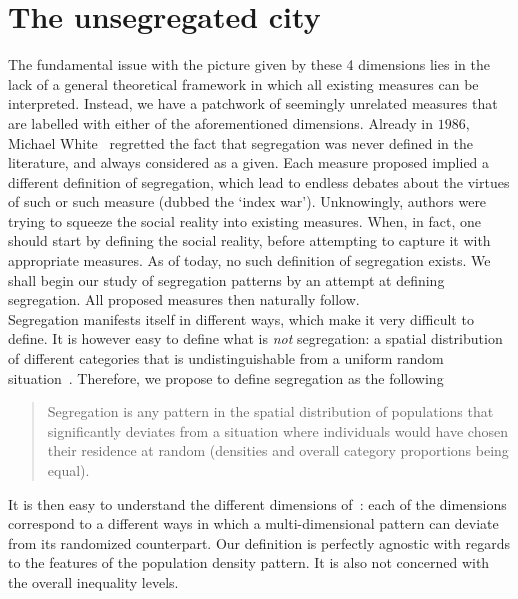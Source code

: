\section{The unsegregated city}
\label{sec:null_model_the_unsegregated_city}

The fundamental issue with the picture given by these 4 dimensions lies in the
lack of a general theoretical framework in which all existing measures can be
interpreted.  Instead, we have a patchwork of seemingly unrelated measures that
are labelled with either of the aforementioned dimensions. Already in $1986$,
Michael White~\cite{White:1986} regretted the fact that segregation was never
defined in the literature, and always considered as a given. Each measure
proposed implied a different definition of segregation, which lead to endless
debates about the virtues of such or such measure (dubbed the `index war').
Unknowingly, authors were trying to squeeze the social reality into existing
measures. When, in fact, one should start by defining the social reality, before
attempting to capture it with appropriate measures. As of today, no such
definition of segregation exists. We shall begin our study of segregation
patterns by an attempt at defining segregation. All proposed measures then
naturally follow.\\

Segregation manifests itself in different ways, which make it very difficult to
define. It is however easy to define what is \emph{not} segregation: a spatial
distribution of different categories that is undistinguishable from a uniform
random situation~\cite{Jahn:1947}. Therefore, we propose to define segregation
as the following

\begin{quote}
Segregation is any pattern in the spatial distribution of populations that
significantly deviates from a situation where individuals would have chosen
their residence at random (densities and overall category proportions being
equal).  
\end{quote} 

It is then easy to understand the different dimensions
of~\cite{Massey:1988,Reardon:2004}: each of the dimensions correspond to a
different ways in which a multi-dimensional pattern can deviate from its
randomized counterpart. Our definition is perfectly agnostic with regards to
the features of the population density pattern. It is also not concerned with
the overall inequality levels.\\

